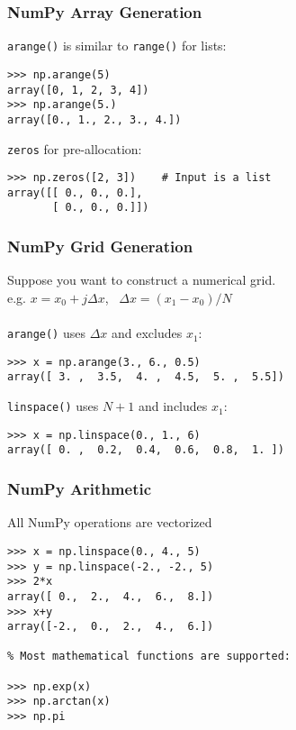 \begin{frame}[fragile]
    \frametitle{NumPy Array Generation}

    \lstinline|arange()| is similar to \lstinline|range()| for lists:
    \begin{lstlisting}
>>> np.arange(5)
array([0, 1, 2, 3, 4])
>>> np.arange(5.)
array([0., 1., 2., 3., 4.])
    \end{lstlisting}
    
    \lstinline|zeros| for pre-allocation:
    \begin{lstlisting}
>>> np.zeros([2, 3])    # Input is a list
array([[ 0., 0., 0.],
       [ 0., 0., 0.]])
    \end{lstlisting}
\end{frame}

\begin{frame}[fragile]
    \frametitle{NumPy Grid Generation}
   
    Suppose you want to construct a numerical grid.\\
    e.g. $x = x_0 + j \Delta x$, \ $\Delta x = (x_1 - x_0) / N$
    \\~\\
    \lstinline|arange()| uses $\Delta x$ and excludes $x_1$:
    \begin{lstlisting}
>>> x = np.arange(3., 6., 0.5)
array([ 3. ,  3.5,  4. ,  4.5,  5. ,  5.5])
    \end{lstlisting}
    \lstinline|linspace()| uses $N+1$ and includes $x_1$:
    \begin{lstlisting}
>>> x = np.linspace(0., 1., 6)
array([ 0. ,  0.2,  0.4,  0.6,  0.8,  1. ])
    \end{lstlisting}
\end{frame}

\begin{frame}[fragile]
    \frametitle{NumPy Arithmetic}
    
    All NumPy operations are vectorized
	
    \begin{lstlisting}
>>> x = np.linspace(0., 4., 5)
>>> y = np.linspace(-2., -2., 5)
>>> 2*x
array([ 0.,  2.,  4.,  6.,  8.])
>>> x+y
array([-2.,  0.,  2.,  4.,  6.])

% Most mathematical functions are supported:

>>> np.exp(x)
>>> np.arctan(x)
>>> np.pi
    \end{lstlisting}
\end{frame}

